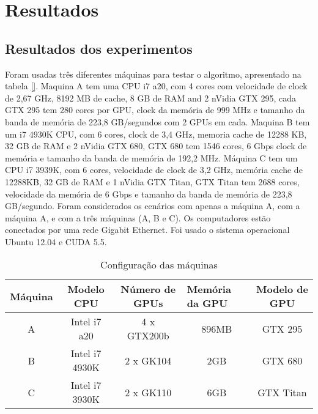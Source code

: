 \pagestyle{empty}
\cleardoublepage
\pagestyle{fancy}

\chapter{Resultados}\label{cap6}

\section{Resultados dos experimentos}\label{cap6:intro}

Foram usadas três diferentes máquinas para testar o algoritmo, apresentado na tabela \ref{}. Maquina A tem uma CPU i7 a20, com 4 cores com velocidade de clock de 2,67 GHz, 8192 MB de cache, 8 GB de RAM and 2 nVidia GTX 295, cada GTX 295 tem 280 cores por GPU, clock da memória de 999 MHz e tamanho da banda de memória de 223,8 GB/segundos com 2 GPUs em cada. Maquina B  tem um i7 4930K CPU, com 6 cores, clock de 3,4 GHz, memoria cache de 12288 KB, 32 GB de RAM e 2 nVidia GTX 680, GTX 680 tem 1546 cores, 6 Gbps clock de memória e tamanho da banda de memória de 192,2 MHz. Máquina C tem um CPU i7 3939K, com 6 cores, velocidade de clock de 3,2 GHz, memória cache de 12288KB, 32 GB de RAM e 1 nVidia GTX Titan, GTX Titan tem 2688 cores, velocidade da memória de 6 Gbps e tamanho da banda de memória de 223,8 GB/segundo. Foram considerados os cenários com apenas a máquina A, com a máquina A, e com a três máquinas (A, B e C). Os computadores estão conectados por uma rede Gigabit Ethernet. Foi usado o sistema operacional Ubuntu 12.04 e CUDA 5.5.


\begin{table}[!t]
\centering
\tiny
\caption{Configuração das máquinas}

\begin{tabular}{|c|c|c|c|c|}
\hline
\multicolumn{1}{|l|}{Máquina} & Modelo CPU  & Número de GPUs & \multicolumn{1}{l|}{Memória da GPU } & Modelo de GPU \\ \hline
A                             & Intel i7 a20   & 4 x GTX200b         & 896MB                          & GTX 295   \\ \hline
B                             & Intel i7 4930K  & 2 x GK104           & 2GB                            & GTX 680   \\ \hline
C                             & Intel i7 3930K & 2 x GK110     & 6GB                            & GTX Titan \\ \hline
\end{tabular}
\label{table: machines}
\end{table}


